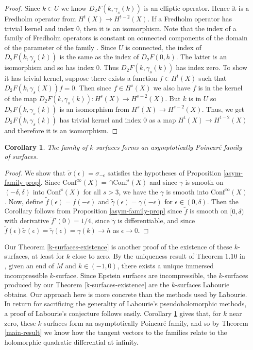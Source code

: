 \documentclass{amsart}
\newtheorem{cor}[thm]{Corollary}
\begin{document}
\begin{proof}
Since $k \in U$ we know $D_2F(k,\gamma_s(k))$ is an elliptic operator. 
Hence it is a Fredholm operator from $H^t(X) \to H^{t-2}(X)$. 
If a Fredholm operator has trivial kernel and index 0, then it is an isomorphism. 
Note that the index of a family of Fredholm operators is constant on connected components of the domain of the parameter of the family \cite{lawson-michelsohn1989}. 
Since $U$ is connected, the index of $D_2F(k,\gamma_s(k))$ is the same as the index of $D_2F(0,h)$. 
The latter is an isomorphism and so has index 0. 
Thus $D_2F(k,\gamma_s(k))$ has index zero. 
To show it has trivial kernel, suppose there exists a function $f \in H^t(X)$ such that $D_2F(k,\gamma_s(X))f = 0$. 
Then since $f \in H^s(X)$ we also have $f$ is in the kernel of the map $D_2F(k,\gamma_s(k)): H^s(X) \to H^{s-2}(X)$. 
But $k$ is in $U$ so $D_2F(k,\gamma_s(k))$ is an isomorphism from $H^s(X) \to H^{s-2}(X)$. 
Thus, we get $D_2F(k,\gamma_s(k))$ has trivial kernel and index 0 as a map $H^t(X) \to H^{t-2}(X)$ and therefore it is an isomorphism. 

\end{proof}


\begin{cor}
\label{k-surfaces-parallel}
The family of $k$-surfaces forms an asymptotically Poincar\'e family of surfaces. 
\label{k-surfaces-cor}
\end{cor}

\begin{proof}
We show that $\tilde{\sigma}(\epsilon) = \sigma_{-\epsilon}$ satisfies the hypotheses of Proposition \ref{asym-family-prop}. 
Since $\mathrm{Conf}^\infty(X) = \cap \mathrm{Conf}^s(X)$ and since $\gamma$ is smooth on $(-\delta,\delta)$ into $\mathrm{Conf}^s(X)$ for all $s > 3$, we have the $\gamma$ is smooth into $\mathrm{Conf}^\infty(X)$.
Now, define $\tilde{f}(\epsilon) = f(- \epsilon)$ and $\tilde{\gamma}(\epsilon) = \gamma(-\epsilon)$ for $\epsilon \in (0,\delta)$. 
Then the Corollary follows from Proposition \ref{asym-family-prop} since $\tilde{f}$ is smooth on $[0,\delta)$ with derivative $\tilde{f}'(0) = 1/4$, since $\tilde{\gamma}$ is differentiable, and since $\tilde{f}(\epsilon) \tilde{\sigma}(\epsilon) = \tilde{\gamma}(\epsilon) = \gamma(k) \to h$ as $\epsilon \to 0$.
\end{proof}


Our Theorem \ref{k-surfaces-existence} is another proof of the existence of these $k$-surfaces, at least for $k$ close to zero. 
By the uniqueness result of Theorem 1.10 in \cite{labourie1992}, given an end of $M$ and $k \in (-1,0)$, there exists a unique immersed incompressible $k$-surface. 
Since Epstein surfaces are incompressible, the $k$-surfaces produced by our Theorem \ref{k-surfaces-existence} are the $k$-surfaces Labourie obtains. 
Our approach here is more concrete than the methods used by Labourie. 
In return for sacrificing the generality of Labourie's pseudoholomorphic methods, a proof of Labourie's conjecture follows easily. 
Corollary \ref{k-surfaces-parallel} gives that, for $k$ near zero, these $k$-surfaces form an asymptotically Poincar\'e family, and so by Theorem \ref{main-result} we know how the tangent vectors to the families relate to the holomorphic quadratic differential at infinity. 
\end{document}
